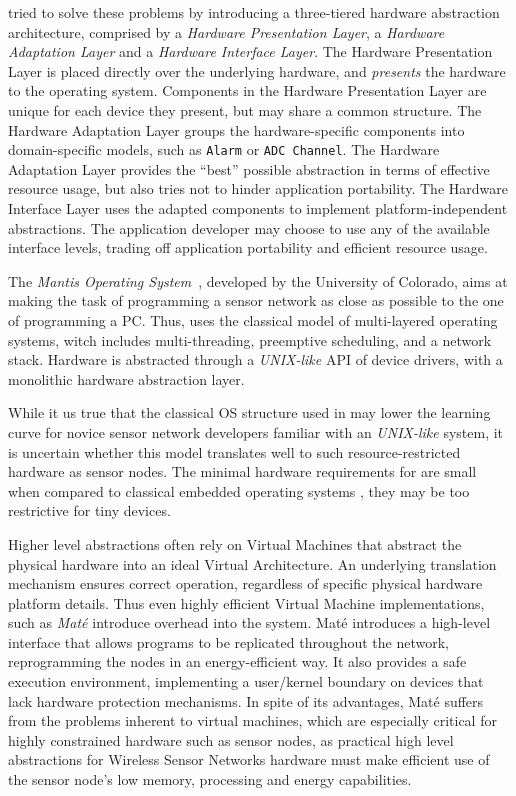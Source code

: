 \tos{} tried to solve these problems by introducing a three-tiered hardware
abstraction architecture, comprised by a \emph{Hardware Presentation Layer}, a
\emph{Hardware Adaptation Layer} and a \emph{Hardware Interface Layer}. 
The Hardware
Presentation Layer is placed directly over the underlying hardware, and
\emph{presents} the hardware to the operating system. Components in the
Hardware Presentation Layer are unique for each device they present, but may
share a common structure. The Hardware Adaptation Layer groups the 
hardware-specific components into domain-specific models, such as 
\texttt{Alarm} or \texttt{ADC Channel}. The Hardware Adaptation Layer 
provides the ``best'' possible abstraction in terms of effective resource
usage, but also tries not to hinder application portability. The Hardware
Interface Layer uses the adapted components to implement
platform-independent abstractions. The \tos{} application developer may
choose to use any of the available interface levels, trading off 
application portability and efficient resource usage.

The \emph{Mantis Operating System}~\cite{Abrach:2003}, developed by the
University of Colorado, aims at making the task of programming a sensor
network as close as possible to the one of programming a PC.
Thus, \mos{} uses the classical model of multi-layered operating systems,
witch includes multi-threading, preemptive scheduling, and a network
stack. Hardware is abstracted through a \emph{UNIX-like} API of device
drivers, with a monolithic hardware abstraction layer.

While it us true that the classical OS structure used in \mos{} may
lower the learning curve for novice sensor network developers familiar
with an \emph{UNIX-like} system, it is uncertain whether this model translates
well to such resource-restricted hardware as sensor nodes. The minimal
hardware requirements for \mos{} are small when compared to classical
embedded operating systems \cite{Massa:2003}, they may be too restrictive for
tiny devices.

Higher level abstractions often rely on Virtual Machines that abstract
the physical hardware into an ideal Virtual Architecture. An
underlying translation mechanism ensures correct operation, regardless
of specific physical hardware platform details.  Thus even highly
efficient Virtual Machine implementations, such as \emph{Mat\'{e}}
\cite{Levis:2002} introduce overhead into the system. {Mat\'{e}}
introduces a high-level interface that allows programs to be
replicated throughout the network, reprogramming the nodes in an
energy-efficient way. It also provides a safe execution environment, 
implementing a user/kernel boundary on devices that lack hardware 
protection mechanisms. In spite of its advantages, {Mat\'{e}}
suffers from the problems inherent to virtual machines, which are
especially critical for highly constrained hardware such as sensor
nodes, as practical high level abstractions for Wireless Sensor
Networks hardware must make efficient use of the sensor node's low
memory, processing and energy capabilities.


